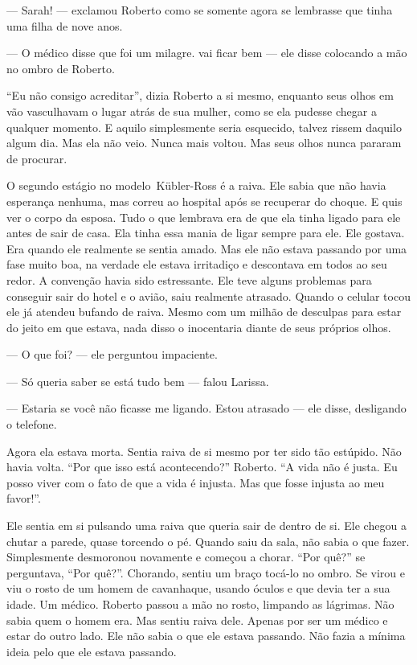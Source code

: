 --- Sarah! --- exclamou Roberto\mudanca{,} como se somente agora se lembrasse que tinha uma filha de nove anos.

--- O médico disse que foi um milagre.  vai ficar bem --- ele disse colocando a mão no ombro de Roberto.

``Eu não consigo acreditar'', dizia Roberto a si mesmo, enquanto seus olhos em vão vasculhavam o lugar atrás de sua mulher, como se ela pudesse chegar a qualquer momento. E aquilo simplesmente seria esquecido, talvez rissem daquilo algum dia. Mas ela não veio. Nunca mais voltou. Mas seus olhos nunca pararam de procurar.

O segundo estágio no modelo~Kübler-Ross é a raiva. Ele sabia que não havia esperança nenhuma, mas correu ao hospital após se recuperar do choque. E quis ver o corpo da esposa. Tudo o que  lembrava era de que ela tinha ligado para ele antes de sair de casa. Ela tinha essa mania de ligar sempre para ele. Ele gostava. Era quando ele realmente se sentia amado. Mas ele não estava passando por uma fase muito boa, na verdade ele estava irritadiço e descontava em todos ao seu redor. A convenção havia sido estressante. Ele teve alguns problemas para conseguir sair do hotel e  o avião, saiu realmente atrasado. Quando o celular tocou ele já atendeu bufando de raiva. Mesmo com um milhão de desculpas para estar do jeito em que estava, nada disso o inocentaria diante de seus próprios olhos.

--- O que foi? --- ele perguntou impaciente.

--- Só queria saber se está tudo bem --- falou Larissa.

--- Estaria se você não ficasse me ligando. Estou atrasado --- ele disse, desligando o telefone.

Agora ela estava morta. Sentia raiva de si mesmo por ter sido tão estúpido. Não havia volta. ``Por que isso está acontecendo?'' Roberto. ``A vida não é justa. Eu posso viver com o fato de que a vida é injusta. Mas que fosse injusta ao meu favor!''.

Ele sentia em si pulsando uma raiva que queria sair de dentro de si. Ele chegou a chutar a parede, quase torcendo o pé. Quando saiu da sala, não sabia o que fazer. Simplesmente desmoronou novamente e começou a chorar. ``Por quê?'' se perguntava, ``Por quê?''. Chorando, sentiu um braço tocá-lo no ombro. Se virou e viu o rosto de um homem de cavanhaque, usando óculos e que devia ter a sua idade. Um médico. Roberto passou a mão no rosto, limpando as lágrimas. Não sabia quem o homem era. Mas sentiu raiva dele. Apenas por ser um médico e estar do outro lado. Ele não sabia o que ele estava passando. Não fazia a mínima ideia pelo que ele estava passando.

